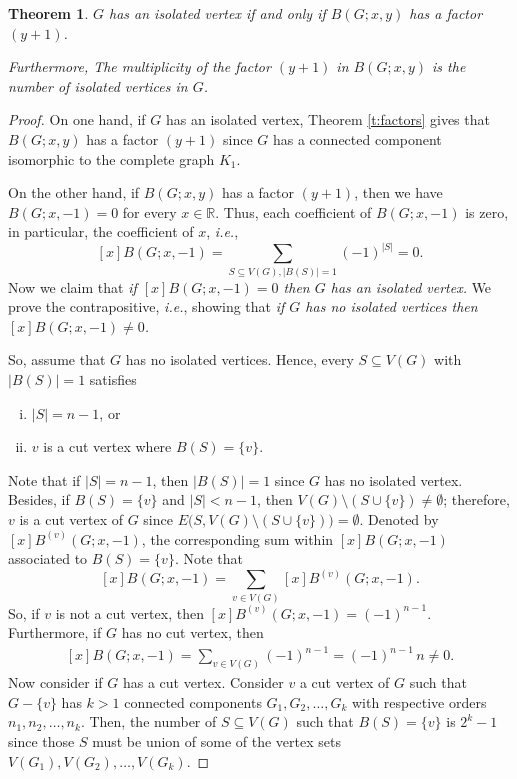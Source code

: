 \documentclass[review]{elsarticle}
\newtheorem{theorem}{Theorem}[section]
\begin{document}
\begin{theorem}\label{t:isolate}
  $G$ has an isolated vertex if and only if $B(G;x,y)$ has a factor $(y+1)$. 
  
  Furthermore, The multiplicity of the factor $(y+1)$ in $B(G;x,y)$ is the number of isolated vertices in $G$.
\end{theorem}

\begin{proof}
    On one hand, if $G$ has an isolated vertex, Theorem \ref{t:factors} gives that $B(G;x,y)$ has a factor $(y+1)$ since $G$ has a connected component isomorphic to the complete graph $K_1$.

    \medskip

    On the other hand, if $B(G;x,y)$ has a factor $(y+1)$, then we have $B(G;x,-1)=0$ for every $x\in\mathbb{R}$. Thus, each coefficient of $B(G;x,-1)$ is zero, in particular, the coefficient of $x$, \emph{i.e.}, $$[x]B(G;x,-1)=\displaystyle\sum_{S\subseteq V(G),|B(S)|=1} (-1)^{|S|}=0.$$ 
    Now we claim that \emph{if $[x]B(G;x,-1)=0$ then $G$ has an isolated vertex.} We prove the contrapositive, \emph{i.e.}, showing that \emph{if $G$ has no isolated vertices then $[x]B(G;x,-1)\neq0$.}

    So, assume that $G$ has no isolated vertices. Hence, every $S\subseteq V(G)$ with $|B(S)|=1$ satisfies 
    \begin{enumerate}[i)]
        \item $|S|=n-1$, or
        \item $v$ is a cut vertex where $B(S)=\{v\}$.
    \end{enumerate}
    Note that if $|S|=n-1$, then $|B(S)|=1$ since $G$ has no isolated vertex. Besides, if $B(S)=\{v\}$ and $|S|<n-1$, then $V(G)\setminus (S\cup\{v\})\neq\emptyset$; therefore, $v$ is a cut vertex of $G$ since $E\Big(S,V(G)\setminus (S\cup\{v\})\Big)=\emptyset$.  
    Denoted by $[x]B^{(v)}(G;x,-1)$, the corresponding sum within $[x]B(G;x,-1)$ associated to $B(S)=\{v\}$. Note that $$[x]B(G;x,-1)=\displaystyle\sum_{v\in V(G)} [x]B^{(v)}(G;x,-1).$$ 
    So, if $v$ is not a cut vertex, then $[x]B^{(v)}(G;x,-1)=(-1)^{n-1}$.
    Furthermore, if $G$ has no cut vertex, then 
    \begin{align}\label{eq:sum_v}
     [x]B(G;x,-1)=\displaystyle\sum_{v\in V(G)} (-1)^{n-1}=(-1)^{n-1}\,n\neq0.
    \end{align}
    Now consider if $G$ has a cut vertex. Consider $v$ a cut vertex of $G$ such that $G-\{v\}$ has $k>1$ connected components $G_1,G_2,\ldots,G_k$ with respective orders $n_1,n_2,\ldots,n_k$. Then, the number of $S\subseteq V(G)$ such that $B(S)=\{v\}$ is $2^k-1$ since those $S$ must be union of some of the vertex sets $V(G_1), V(G_2),\ldots, V(G_k)$. 
    

\end{proof}
\end{document}
